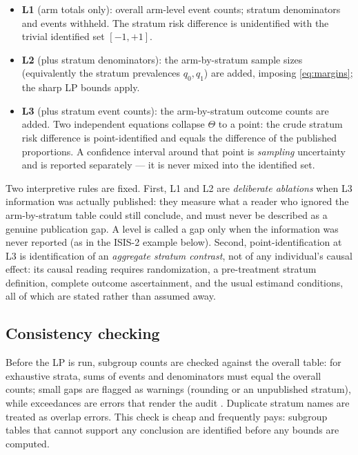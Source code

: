 \documentclass[article]{ajs}
\begin{document}
\begin{itemize}
\item \textbf{L1} (arm totals only): overall arm-level event counts;
      stratum denominators and events withheld. The stratum risk
      difference is unidentified with the trivial identified set
      $[-1, +1]$.
\item \textbf{L2} (plus stratum denominators): the arm-by-stratum
      sample sizes (equivalently the stratum prevalences $q_0, q_1$)
      are added, imposing \eqref{eq:margins}; the sharp LP bounds
      apply.
\item \textbf{L3} (plus stratum event counts): the arm-by-stratum
      outcome counts are added. Two independent equations collapse
      $\Theta$ to a point: the crude stratum risk difference is
      point-identified and equals the difference of the published
      proportions. A confidence interval around that point is
      \emph{sampling} uncertainty and is reported separately --- it
      is never mixed into the identified set.
\end{itemize}

Two interpretive rules are fixed. First, L1 and L2 are
\emph{deliberate ablations} when L3 information was actually
published: they measure what a reader who ignored the arm-by-stratum
table could still conclude, and must never be described as a genuine
publication gap. A level is called a gap only when the information
was never reported (as in the ISIS-2 example below). Second,
point-identification at L3 is identification of an \emph{aggregate
stratum contrast}, not of any individual's causal effect: its causal
reading requires randomization, a pre-treatment stratum definition,
complete outcome ascertainment, and the usual estimand conditions,
all of which are stated rather than assumed away.

\subsection{Consistency checking}
\label{sec:consistency}

Before the LP is run, subgroup counts are checked against the overall
table: for exhaustive strata, sums of events and denominators must equal
the overall counts; small gaps are flagged as warnings (rounding or an
unpublished stratum), while exceedances are errors that render the audit
. Duplicate stratum names are treated as overlap errors.
This check is cheap and frequently pays: subgroup tables that cannot
support any conclusion are identified before any bounds are computed.
\end{document}
